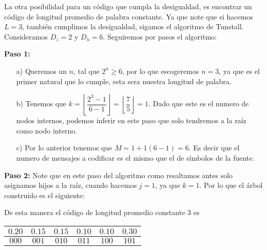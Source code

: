 \begin{sols}
 La otra posibilidad para un código que cumpla la desigualdad, es encontrar un código de longitud promedio de palabra constante. Ya que note que si hacemos $L=3$, también cumplimos la desigualdad, sigamos el algoritmo de Tunstall. Consideramos $D_z=2$ y $D_u=6.$ Seguiremos por pasos el algoritmo:

\textbf{Paso 1:}
\begin{itemize}
    \item[a)] Queremos un $n$, tal que $2^n\geq 6$, por lo que escogeremos $n=3$, ya que es el primer natural que lo cumple, esta sera nuestra longitud de palabra.
    \item[b)] Tenemos que $k=\left\lfloor\dfrac{2^3-1}{6-1}\right\rfloor=\left\lfloor\dfrac{7}{5}\right\rfloor=1.$ Dado que este es el numero de nodos internos, podemos inferir en este paso que solo tendremos a la raíz como nodo interno.
    \item[c)] Por lo anterior tenemos que $M=1+1(6-1)=6.$ Es decir que el numero de mensajes a codificar es el mismo que el de símbolos de la fuente.
\end{itemize}
\textbf{Paso 2:}
 Note que en este paso del algoritmo como resaltamos antes solo asignamos hijos a la raíz, cuando hacemos $j=1$, ya que $k=1.$ Por  lo que el árbol construido es el siguiente:
 \begin{center}
    \end{center}
De esta manera el código de longitud promedio constante 3 es
\begin{center}
  \begin{tabular}{|c|c|c|c|c|c|}
  \hline
$0.20$ & $0.15$ & $0.15$ & $0.10$ & $0.10$ & $0.30$\\
\hline
$000$ & $001$ & $010$ & $011$ & $100$ & $101$\\
\hline
 \end{tabular}
 \end{center}

\end{sols}